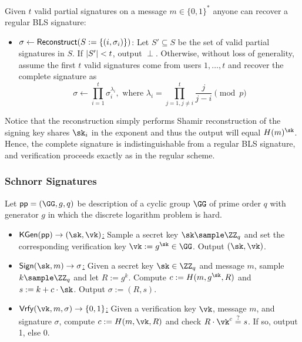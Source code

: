  Given $t$ valid partial signatures on a message $m \in \{0,1\}^*$ anyone can recover a regular BLS signature:

\begin{itemize}
    \item \underline{$\sigma \gets \mathsf{Reconstruct}(S := \{(i, \sigma_i)\})$}: Let $S' \subseteq S$ be the set of valid partial signatures in $S$. If $\lvert S' \rvert < t$, output $\perp$. Otherwise, without loss of generality, assume the first $t$ valid signatures come from users $1, \dots, t$ and recover the complete signature as
    \[
        \sigma \gets \prod_{i=1}^t \sigma_i^{\lambda_i}, \text{ where } \lambda_i = \prod_{j=1,j\neq i}^t \frac{j}{j-i} \pmod{p}
    \]
\end{itemize}

Notice that the reconstruction simply performs Shamir reconstruction of the signing key shares $\sk_i$ in the exponent and thus the output will equal $\blshash(m)^{\sk}$. Hence, the complete signature is indistinguishable from a regular BLS signature, and verification proceeds exactly as in the regular scheme.

\subsubsection{Schnorr Signatures}\label{sec:schnorr}

\begin{construction}
    Let $\pparam = (\GG, g, q)$ be description of a cyclic group $\GG$ of prime order $q$ with generator $g$ in which the discrete logarithm problem is hard.
    \begin{itemize}
        \item \underline{$\kgen(\pparam) \to (\sk, \vk)$:} Sample a secret key $\sk \sample \ZZ_q$ and set the corresponding verification key $\vk := g^{\sk} \in \GG$. Output $(\sk, \vk)$.
        \item \underline{$\sign(\sk, m) \to \sigma$:} Given a secret key $\sk \in \ZZ_q$ and message $m$, sample $k \sample \ZZ_q$ and let $R := g^k$. Compute $c := H(m, g^\sk, R)$ and $s := k + c \cdot \sk$. Output $\sigma := (R, s)$.
        \item \underline{$\vrfy(\vk, m, \sigma) \to \{0,1\}$:} Given a verification key $\vk$, message $m$, and signature $\sigma$, compute $c := H(m, \vk, R)$ and check $R \cdot \vk^c \stackrel{?}{=} s$. If so, output 1, else 0.
    \end{itemize}
\end{construction}

